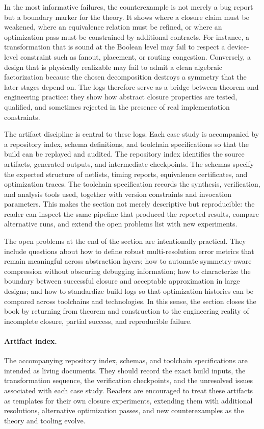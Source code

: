 \documentclass[11pt]{article}
\begin{document}
In the most informative failures, the counterexample is not merely a bug report but a boundary marker for the theory. It shows where a closure claim must be weakened, where an equivalence relation must be refined, or where an optimization pass must be constrained by additional contracts. For instance, a transformation that is sound at the Boolean level may fail to respect a device-level constraint such as fanout, placement, or routing congestion. Conversely, a design that is physically realizable may fail to admit a clean algebraic factorization because the chosen decomposition destroys a symmetry that the later stages depend on. The logs therefore serve as a bridge between theorem and engineering practice: they show how abstract closure properties are tested, qualified, and sometimes rejected in the presence of real implementation constraints.

The artifact discipline is central to these logs. Each case study is accompanied by a repository index, schema definitions, and toolchain specifications so that the build can be replayed and audited. The repository index identifies the source artifacts, generated outputs, and intermediate checkpoints. The schemas specify the expected structure of netlists, timing reports, equivalence certificates, and optimization traces. The toolchain specification records the synthesis, verification, and analysis tools used, together with version constraints and invocation parameters. This makes the section not merely descriptive but reproducible: the reader can inspect the same pipeline that produced the reported results, compare alternative runs, and extend the open problems list with new experiments.

The open problems at the end of the section are intentionally practical. They include questions about how to define robust multi-resolution error metrics that remain meaningful across abstraction layers; how to automate symmetry-aware compression without obscuring debugging information; how to characterize the boundary between successful closure and acceptable approximation in large designs; and how to standardize build logs so that optimization histories can be compared across toolchains and technologies. In this sense, the section closes the book by returning from theorem and construction to the engineering reality of incomplete closure, partial success, and reproducible failure.

\paragraph{Artifact index.} The accompanying repository index, schemas, and toolchain specifications are intended as living documents. They should record the exact build inputs, the transformation sequence, the verification checkpoints, and the unresolved issues associated with each case study. Readers are encouraged to treat these artifacts as templates for their own closure experiments, extending them with additional resolutions, alternative optimization passes, and new counterexamples as the theory and tooling evolve.
\end{document}
